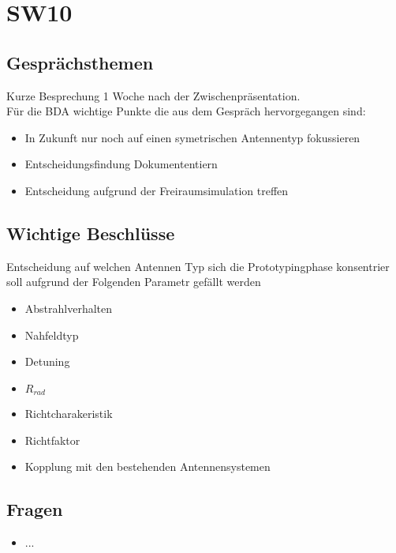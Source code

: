 \documentclass[10pt,a4paper]{article}
\begin{document}
\section*{SW10}

\subsection*{Gesprächsthemen}

Kurze Besprechung 1 Woche nach der Zwischenpräsentation.\\

\vspace{10 mm}
Für die BDA wichtige Punkte die aus dem Gespräch hervorgegangen sind:
\begin{itemize}
	\item In Zukunft nur noch auf einen symetrischen Antennentyp fokussieren
	\item Entscheidungsfindung Dokumententiern
	\item Entscheidung aufgrund der Freiraumsimulation treffen
	
\end{itemize}

\subsection*{Wichtige Beschlüsse}
Entscheidung auf welchen Antennen Typ sich die Prototypingphase konsentrier soll aufgrund der Folgenden Parametr gefällt werden
\begin{itemize}
	\item Abstrahlverhalten
	\item Nahfeldtyp
	\item Detuning 
	\item $R_{rad}$
	\item Richtcharakeristik
	\item Richtfaktor 
	\item Kopplung mit den bestehenden Antennensystemen
\end{itemize}
\subsection*{Fragen}
\begin{itemize}
	\item ...
\end{itemize}
\end{document}
